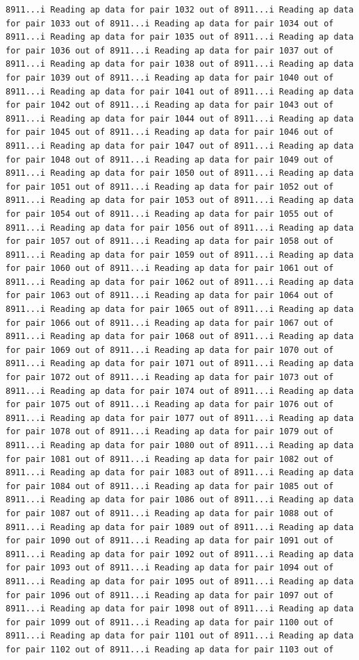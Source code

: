 \documentclass[
]{article}
\begin{document}
\begin{verbatim}
8911...i Reading ap data for pair 1032 out of 8911...i Reading ap data for pair 1033 out of 8911...i Reading ap data for pair 1034 out of 8911...i Reading ap data for pair 1035 out of 8911...i Reading ap data for pair 1036 out of 8911...i Reading ap data for pair 1037 out of 8911...i Reading ap data for pair 1038 out of 8911...i Reading ap data for pair 1039 out of 8911...i Reading ap data for pair 1040 out of 8911...i Reading ap data for pair 1041 out of 8911...i Reading ap data for pair 1042 out of 8911...i Reading ap data for pair 1043 out of 8911...i Reading ap data for pair 1044 out of 8911...i Reading ap data for pair 1045 out of 8911...i Reading ap data for pair 1046 out of 8911...i Reading ap data for pair 1047 out of 8911...i Reading ap data for pair 1048 out of 8911...i Reading ap data for pair 1049 out of 8911...i Reading ap data for pair 1050 out of 8911...i Reading ap data for pair 1051 out of 8911...i Reading ap data for pair 1052 out of 8911...i Reading ap data for pair 1053 out of 8911...i Reading ap data for pair 1054 out of 8911...i Reading ap data for pair 1055 out of 8911...i Reading ap data for pair 1056 out of 8911...i Reading ap data for pair 1057 out of 8911...i Reading ap data for pair 1058 out of 8911...i Reading ap data for pair 1059 out of 8911...i Reading ap data for pair 1060 out of 8911...i Reading ap data for pair 1061 out of 8911...i Reading ap data for pair 1062 out of 8911...i Reading ap data for pair 1063 out of 8911...i Reading ap data for pair 1064 out of 8911...i Reading ap data for pair 1065 out of 8911...i Reading ap data for pair 1066 out of 8911...i Reading ap data for pair 1067 out of 8911...i Reading ap data for pair 1068 out of 8911...i Reading ap data for pair 1069 out of 8911...i Reading ap data for pair 1070 out of 8911...i Reading ap data for pair 1071 out of 8911...i Reading ap data for pair 1072 out of 8911...i Reading ap data for pair 1073 out of 8911...i Reading ap data for pair 1074 out of 8911...i Reading ap data for pair 1075 out of 8911...i Reading ap data for pair 1076 out of 8911...i Reading ap data for pair 1077 out of 8911...i Reading ap data for pair 1078 out of 8911...i Reading ap data for pair 1079 out of 8911...i Reading ap data for pair 1080 out of 8911...i Reading ap data for pair 1081 out of 8911...i Reading ap data for pair 1082 out of 8911...i Reading ap data for pair 1083 out of 8911...i Reading ap data for pair 1084 out of 8911...i Reading ap data for pair 1085 out of 8911...i Reading ap data for pair 1086 out of 8911...i Reading ap data for pair 1087 out of 8911...i Reading ap data for pair 1088 out of 8911...i Reading ap data for pair 1089 out of 8911...i Reading ap data for pair 1090 out of 8911...i Reading ap data for pair 1091 out of 8911...i Reading ap data for pair 1092 out of 8911...i Reading ap data for pair 1093 out of 8911...i Reading ap data for pair 1094 out of 8911...i Reading ap data for pair 1095 out of 8911...i Reading ap data for pair 1096 out of 8911...i Reading ap data for pair 1097 out of 8911...i Reading ap data for pair 1098 out of 8911...i Reading ap data for pair 1099 out of 8911...i Reading ap data for pair 1100 out of 8911...i Reading ap data for pair 1101 out of 8911...i Reading ap data for pair 1102 out of 8911...i Reading ap data for pair 1103 out of 
\end{verbatim}
\end{document}
